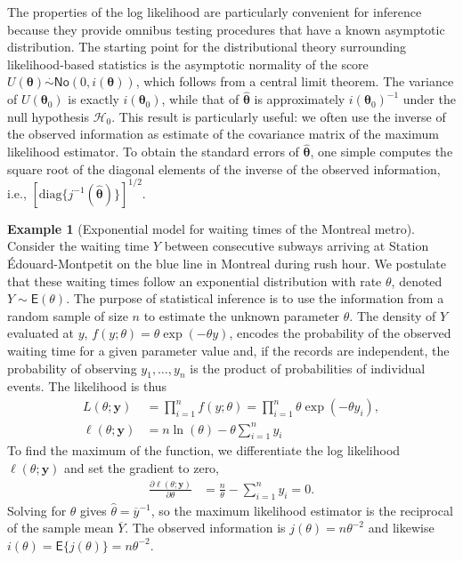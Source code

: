 \documentclass[
  11pt,
  letterpaper,
]{book}
\theoremstyle{definition}
\theoremstyle{definition}
\newtheorem{example}{Example}[chapter]
\theoremstyle{definition}
\theoremstyle{remark}
\begin{document}
The properties of the log likelihood are particularly convenient for inference because they provide omnibus testing procedures that have a known asymptotic distribution. The starting point for the distributional theory surrounding likelihood-based statistics is the asymptotic normality of the score \(U(\boldsymbol{\theta}) \stackrel{\cdot}{\sim}\mathsf{No}(0, i(\boldsymbol{\theta}))\), which follows from a central limit theorem. The variance of \(U(\boldsymbol{\theta}_0)\) is exactly \(i(\boldsymbol{\theta}_0)\), while that of \(\widehat{\boldsymbol{\theta}}\) is approximately \(i(\boldsymbol{\theta}_0)^{-1}\) under the null hypothesis \(\mathscr{H}_0\). This result is particularly useful: we often use the inverse of the observed information as estimate of the covariance matrix of the maximum likelihood estimator. To obtain the standard errors of \(\widehat{\boldsymbol{\theta}}\), one simple computes the square root of the diagonal elements of the inverse of the observed information, i.e., \([\mathrm{diag}\{j^{-1}(\widehat{\boldsymbol{\theta}})\}]^{1/2}\).

\begin{example}[Exponential model for waiting times of the Montreal metro]
\protect\hypertarget{exm:waitingtime}{}{\label{exm:waitingtime} {} }Consider the waiting time \(Y\) between consecutive subways arriving at Station Édouard-Montpetit on the blue line in Montreal during rush hour. We postulate that these waiting times follow an exponential distribution with rate \(\theta\), denoted \(Y \sim \mathsf{E}(\theta)\). The purpose of statistical inference is to use the information from a random sample of size \(n\) to estimate the unknown parameter \(\theta\). The density of \(Y\) evaluated at \(y\), \(f(y; \theta)=\theta\exp(-\theta y)\), encodes the probability of the observed waiting time for a given parameter value and, if the records are independent, the probability of observing \(y_1, \ldots, y_n\) is the product of probabilities of individual events. The likelihood is thus
\begin{align*}
L(\theta; \boldsymbol{y}) &= \prod_{i=1}^n f(y; \theta)= \prod_{i=1}^n\theta\exp(-\theta y_i),\\
\ell(\theta; \boldsymbol{y}) & = n\ln(\theta) - \theta\sum_{i=1}^n y_i
\end{align*}
To find the maximum of the function, we differentiate the log likelihood \(\ell(\theta; \boldsymbol{y})\) and set the gradient to zero,
\begin{align*}
\frac{\partial \ell(\theta; \boldsymbol{y})}{\partial \theta} & = \frac{n}{\theta} - \sum_{i=1}^n y_i =0.
\end{align*}
Solving for \(\theta\) gives \(\widehat{\theta} = \overline{y}^{-1}\), so the maximum likelihood estimator is the reciprocal of the sample mean \(\overline{Y}\). The observed information is \(j(\theta) = n\theta^{-2}\) and likewise \(i(\theta)=\mathsf{E}\{j(\theta)\}=n\theta^{-2}\).
\end{example}
\end{document}
